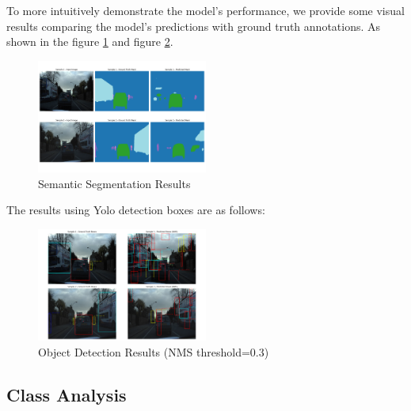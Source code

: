 \documentclass[conference]{IEEEtran}
\begin{document}

To more intuitively demonstrate the model's performance, we provide some visual results comparing the model's predictions with ground truth annotations. As shown in the figure \ref{fig:segmentation} and figure \ref{fig:detection}.

\begin{figure}[htbp]
    \centerline{\includegraphics[width=0.5\textwidth]{matrials/segmentation_results.png}}
    \caption{Semantic Segmentation Results}
    \label{fig:segmentation}
\end{figure}


The results using Yolo detection boxes are as follows:

\begin{figure}[htbp]
    \centerline{\includegraphics[width=0.5\textwidth]{matrials/detection_results.png}}
    \caption{Object Detection Results (NMS threshold=0.3)}
    \label{fig:detection}
\end{figure}



\subsection{Class Analysis}

\end{document}
